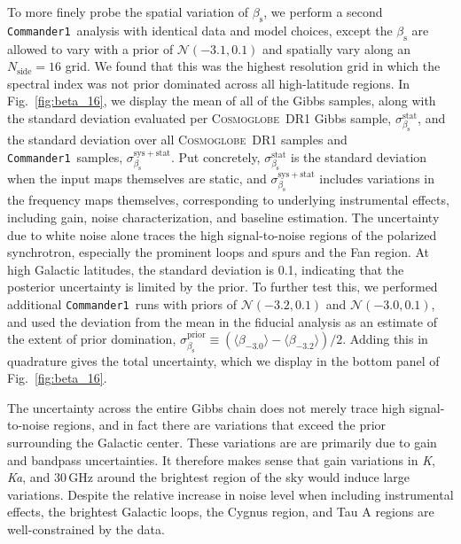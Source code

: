 \documentclass[twocolumn]{../../common/aa}
\def\commanderone{\texttt{Commander1}}
\newcommand{\cosmoglobe}{\textsc{Cosmoglobe}}
\newcommand{\K}[0]{\textit K}
\newcommand{\Ka}[0]{\textit{Ka}}
\begin{document}
To more finely probe the spatial variation of $\beta_\mathrm s$, we perform a second \commanderone\ analysis with identical data and model choices, except the $\beta_\mathrm s$ are allowed to vary with a prior of $\mathcal N(-3.1,0.1)$ and spatially vary along an $N_\mathrm{side}=16$ grid. We found that this was the highest resolution grid in which the spectral index was not prior dominated across all high-latitude regions. In Fig.~\ref{fig:beta_16}, we display the mean of all of the Gibbs samples, along with the standard deviation evaluated per \cosmoglobe\ DR1 Gibbs sample, $\sigma_{\beta_\mathrm s}^\mathrm{stat}$, and the standard deviation over all \cosmoglobe\ DR1 samples and \commanderone\ samples, $\sigma_{\beta_\mathrm s}^\mathrm{sys+stat}$. Put concretely, $\sigma_{\beta_\mathrm s}^\mathrm{stat}$ is the standard deviation when the input maps themselves are static, and $\sigma_{\beta_\mathrm s}^\mathrm{sys+stat}$ includes variations in the frequency maps themselves, corresponding to underlying instrumental effects, including gain, noise characterization, and baseline estimation. The uncertainty due to white noise alone  traces the high signal-to-noise regions of the polarized synchrotron, especially the prominent loops and spurs and the Fan region. At high Galactic latitudes, the standard deviation is 0.1, indicating that the posterior uncertainty is limited by the prior. To further test this, we performed additional \commanderone\ runs with priors of $\mathcal N(-3.2,0.1)$ and $\mathcal N(-3.0,0.1)$, and used the deviation from the mean in the fiducial analysis as an estimate of the extent of prior domination, $\sigma_{\beta_\mathrm s}^\mathrm{prior}\equiv (\langle \beta_{-3.0}\rangle-\langle\beta_{-3.2}\rangle)/2$. Adding this in quadrature gives the total uncertainty, which we display in the bottom panel of Fig.~\ref{fig:beta_16}.

The uncertainty across the entire Gibbs chain does not merely trace high signal-to-noise regions, and in fact there are variations that exceed the prior surrounding the Galactic center. These variations are are primarily due to gain and bandpass uncertainties. It therefore makes sense that gain variations in \K, \Ka, and 30\,GHz around the brightest region of the sky would induce large variations. Despite the relative increase in noise level when including instrumental effects, the brightest Galactic loops, the Cygnus region, and Tau A regions are well-constrained by the data.
\end{document}
